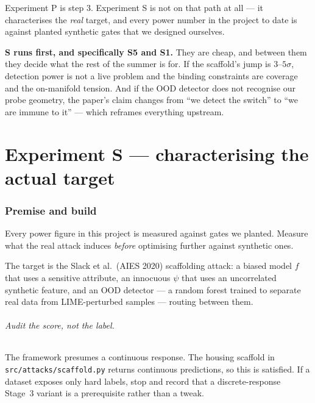 \documentclass[11pt]{article}
\begin{document}
\noindent Experiment P is step 3. Experiment S is not on that path at all --- it characterises
the \emph{real} target, and every power number in the project to date is against planted
synthetic gates that we designed ourselves.

\textbf{S runs first, and specifically S5 and S1.} They are cheap, and between them they decide
what the rest of the summer is for. If the scaffold's jump is $3\text{--}5\sigma$, detection
power is not a live problem and the binding constraints are coverage and the on-manifold
tension. And if the OOD detector does not recognise our probe geometry, the paper's claim
changes from ``we detect the switch'' to ``we are immune to it'' --- which reframes everything
upstream.

\part{Experiment S --- characterising the actual target}

\section{Premise and build}

\begin{claimbox}
\noindent Every power figure in this project is measured against gates we planted. Measure what
the real attack induces \emph{before} optimising further against synthetic ones.
\end{claimbox}

\noindent The target is the Slack et al.\ (AIES 2020) scaffolding attack: a biased model $f$
that uses a sensitive attribute, an innocuous $\psi$ that uses an uncorrelated synthetic
feature, and an OOD detector --- a random forest trained to separate real data from
LIME-perturbed samples --- routing between them.

\paragraph{Audit the score, not the label.} The framework presumes a continuous response. The
housing scaffold in \texttt{src/attacks/}\allowbreak\texttt{scaffold.py} returns continuous predictions, so this is
satisfied. If a dataset exposes only hard labels, stop and record that a discrete-response
Stage~3 variant is a prerequisite rather than a tweak.
\end{document}
